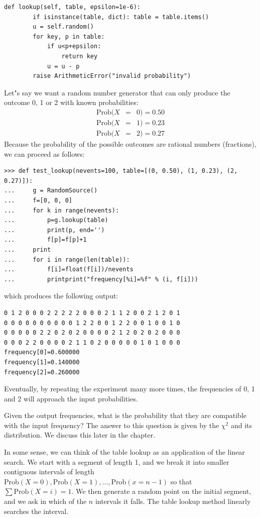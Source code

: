 \documentclass[justified, sixbynine]{tufte-book}
\def\ft{\small\tt}
\theoremstyle{plain}%
\newtheorem * {corollary}{Corollary}
\theoremstyle{definition}
\theoremstyle{remark}
\newtheorem * {remark}{Remark}
\newtheorem * {note}{Note}
\begin{document}
\begin{fullwidth}
\begin{lstlisting}[caption={in file: {\ft nlib.py}}]
    def lookup(self, table, epsilon=1e-6):
        if isinstance(table, dict): table = table.items()
        u = self.random()
        for key, p in table:
            if u<p+epsilon:
                return key
            u = u - p
        raise ArithmeticError("invalid probability")
\end{lstlisting}

Let"s say we want a random number generator that can only produce the
outcome 0, 1 or 2 with known probabilities:
\begin{eqnarray}
\textrm{Prob}(X &=&0)=0.50 \\
\textrm{Prob}(X &=&1)=0.23 \\
\textrm{Prob}(X &=&2)=0.27
\end{eqnarray}
Because the probability of the possible outcomes are rational numbers
(fractions), we can proceed as follows:
\begin{lstlisting}
>>> def test_lookup(nevents=100, table=[(0, 0.50), (1, 0.23), (2, 0.27)]):
...     g = RandomSource()
...     f=[0, 0, 0]
...     for k in range(nevents):
...         p=g.lookup(table)
...         print(p, end='')
...         f[p]=f[p]+1
...     print
...     for i in range(len(table)):
...         f[i]=float(f[i])/nevents
...         printprint("frequency[%i]=%f" % (i, f[i]))
\end{lstlisting}

which produces the following output:

\begin{lstlisting}
0 1 2 0 0 0 2 2 2 2 2 0 0 0 2 1 1 2 0 0 2 1 2 0 1
0 0 0 0 0 0 0 0 0 0 1 2 2 0 0 1 2 2 0 0 1 0 0 1 0
0 0 0 0 0 2 2 0 2 0 2 0 0 0 0 2 1 2 0 2 0 2 0 0 0
0 0 0 2 2 0 0 0 0 2 1 1 0 2 0 0 0 0 0 1 0 1 0 0 0
frequency[0]=0.600000
frequency[1]=0.140000
frequency[2]=0.260000
\end{lstlisting}

Eventually, by repeating the experiment many more times, the frequencies of
0, 1 and 2 will approach the input probabilities.

Given the output frequencies, what is the probability that they are compatible with the input frequency?
The answer to this question is given by the $\chi^2$ and its distribution. We discuss this later in the chapter.

In some sense, we can think of the table lookup as an application of the
linear search. We start with a segment of length 1, and we break it into smaller
contiguous intervals of length $\textrm{Prob}(X=0), \textrm{Prob}(X=1), ..., \textrm{Prob}(x=n-1)$ so that $\sum
\textrm{Prob}(X=i)=1.$ We then generate a random point on the initial segment, and we ask
in which of the $n$ intervals it falls. The table lookup method linearly
searches the interval.


\end{fullwidth}
\end{document}
